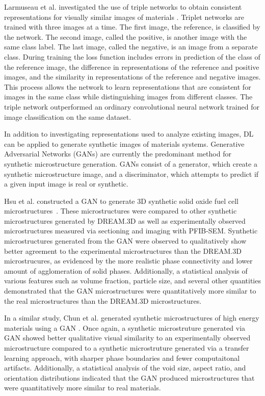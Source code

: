 \documentclass[pdflatex,sn-mathphys]{sn-jnl}%
\theoremstyle{thmstyleone}%
\theoremstyle{thmstyletwo}%
\theoremstyle{thmstylethree}%
\begin{document}
Larmuseau et al. investigated the use of triple networks to obtain consistent representations for visually similar images of materials  \cite{Larmuseau2020}. Triplet networks are trained with three images at a time. The first image, the reference, is classified by the network. The second image, called the positive, is another image with the same class label. The last image, called the negative, is an image from a separate class. During training the loss function includes errors in prediction of the class of the reference image, the difference in representations of the reference and positive images, and the similarity in representations of the reference and negative images. This process allows the network to learn representations that are consistent for images in the same class while distinguishing images from different classes. The triple network outperformed an ordinary convolutional neural network trained for image classification on the same dataset.


In addition to investigating representations used to analyze existing images, DL can be applied to generate synthetic images of materials systems. Generative Adversarial Networks (GANs) are currently the predominant method for synthetic microstructure generation. GANs consist of a generator, which create a synthetic microstructure image, and a discriminator, which attempts to predict if a given input image is real or synthetic. 

Hsu et al. constructed a GAN to generate 3D synthetic solid oxide fuel cell microstructures~\cite{Hsu2020}. These microstructures were compared to other synthetic microstructures generated by DREAM.3D as well as experimentally observed microstructures measured via sectioning and imaging with PFIB-SEM.  Synthetic microstructures generated from the GAN were observed to qualitatively show better agreement to the experimental microstructures than the DREAM.3D microstrucures, as evidenced by the more realistic phase connectivity and lower amount of agglomeration of solid phases. Additionally, a statistical analysis of various features such as volume fraction, particle size, and several other quantities demonstrated that the GAN microstructures were quantitatively more similar to the real microstructures than the DREAM.3D microstructures.

In a similar study, Chun et al. generated synthetic microstructures of high energy materials using a GAN \cite{Chun2020}. Once again, a synthetic microstruture generated via GAN showed better qualitative visual similarity to an experimentally observed microstructure compared to a synthetic microstruture generated via a transfer learning approach, with sharper phase boundaries and fewer computaitonal artifacts. Additionally, a statistical analysis of the void size, aspect ratio, and orientation distributions indicated that the GAN produced microstructures that were quantitatively more similar to real materials.
\end{document}
